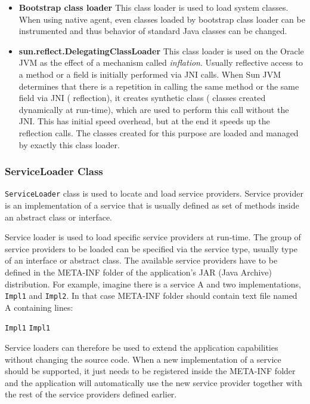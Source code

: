 \begin{itemize}
	\item\textbf{Bootstrap class loader} \newline
	This class loader is used to load system classes. When using native agent, even classes loaded by bootstrap class loader can be instrumented and thus behavior of standard Java classes can be changed.
	
	\item  \textbf{sun.reflect.DelegatingClassLoader} \newline
	This class loader is used on the Oracle JVM as the effect of a mechanism called \textit{inflation}. Usually reflective access to a method or a field is initially performed via JNI calls. When Sun JVM determines that there is a repetition in calling the same method or the same field via JNI ( reflection), it creates synthetic class ( classes created dynamically at run-time), which are used to perform this call without the JNI. This has initial speed overhead, but at the end it speeds up the reflection calls. The classes created for this purpose are loaded and managed by exactly this class loader. 
\end{itemize}
\subsubsection{ServiceLoader Class}
\texttt{ServiceLoader} class is used to locate and load service providers. Service provider is an implementation of a service that is usually defined as set of methods inside an abstract class or interface. 

Service loader is used to load specific service providers at run-time. The group of service providers to be loaded can be specified via the service type, usually type of an interface or abstract class. The available service providers have to be defined in the META-INF folder of the application's JAR (Java Archive) distribution. For example, imagine there is a service A and two implementations, \texttt{Impl1} and \texttt{Impl2}. In that case META-INF folder should contain text file named A containing lines:
\begin{center}
\texttt{Impl1} \newline
\texttt{Impl1}  \newline
\end{center}
Service loaders can therefore be used to extend the application capabilities without changing the source code. When a new implementation of a service should be supported, it just needs to be registered inside the META-INF folder and the application will automatically use the new service provider together with the rest of the service providers defined earlier.
